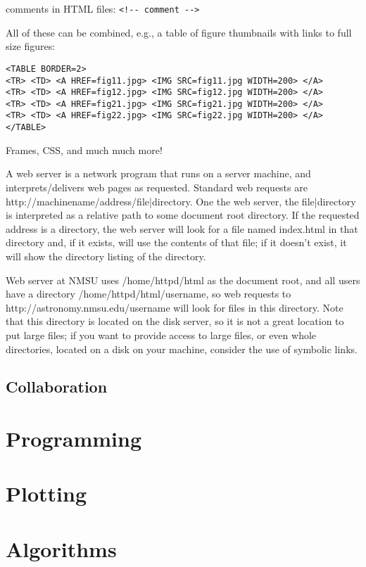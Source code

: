 \documentclass[12pt]{article}
\begin{document}
comments in HTML files: \verb|<!-- comment -->|

All of these can be combined, e.g., a table of figure thumbnails with
links to full size figures:
\begin{verbatim}
<TABLE BORDER=2>
<TR> <TD> <A HREF=fig11.jpg> <IMG SRC=fig11.jpg WIDTH=200> </A>
<TR> <TD> <A HREF=fig12.jpg> <IMG SRC=fig12.jpg WIDTH=200> </A>
<TR> <TD> <A HREF=fig21.jpg> <IMG SRC=fig21.jpg WIDTH=200> </A>
<TR> <TD> <A HREF=fig22.jpg> <IMG SRC=fig22.jpg WIDTH=200> </A>
</TABLE>
\end{verbatim}

Frames, CSS, and much much more!

A web server is a network program that runs on a server machine, and
interprets/delivers web pages as requested. Standard web requests are
http://{machinename/address}/{file|directory}. One the web server, the
{file|directory} is interpreted as a relative path to some document
root directory. If the requested address is a directory, the web
server will look for a file named index.html in that directory and, if
it exists, will use the contents of that file; if it doesn't exist, it
will show the directory listing of the directory.

Web server at NMSU uses /home/httpd/html as the document root, and all
users have a directory /home/httpd/html/{username}, so web requests to
http://astronomy.nmsu.edu/{username} will look for files in this
directory. Note that this directory is located on the disk server, so
it is not a great location to put large files; if you want to provide
access to large files, or even whole directories, located on a disk on
your machine, consider the use of symbolic links.



\subsection{Collaboration}


\section{Programming}

\section{Plotting}


\section{Algorithms}
\end{document}
